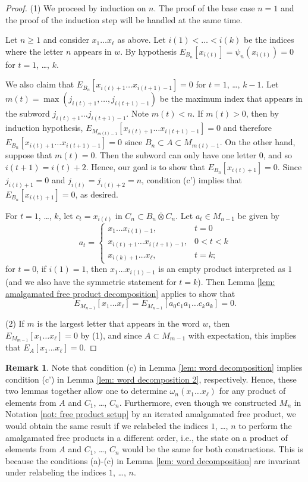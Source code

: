 \documentclass[10pt]{amsart}
\numberwithin{equation}{section}
\theoremstyle{definition}
\newtheorem{remark}[thm]{Remark}
\newcommand{\ootimes}{\mathbin{\overline{\otimes}}}
\begin{document}
\begin{proof}
	(1) We proceed by induction on $n$.  The proof of the base case $n = 1$ and the proof of the induction step will be handled at the same time.
	
	Let $n \geq 1$ and consider $x_1 \dots x_\ell$ as above.  Let $i(1) < \dots < i(k)$ be the indices where the letter $n$ appears in $w$.  By hypothesis $E_{B_n}[x_{i(t)}] = \psi_n(x_{i(t)}) = 0$ for $t = 1$, \dots, $k$.
	
	We also claim that $E_{B_n}[x_{i(t)+1} \dots x_{i(t+1)-1}] = 0$ for $t = 1$, \dots, $k-1$.  Let $m(t) = \max(j_{i(t)+1}, \dots, j_{i(t+1)-1})$ be the maximum index that appears in the subword $j_{i(t)+1} \dots j_{i(t+1)-1}$.  Note $m(t) < n$.  If $m(t) > 0$, then by induction hypothesis, $E_{M_{m(t)-1}}[x_{i(t)+1} \dots x_{i(t+1)-1}] = 0$ and therefore $E_{B_n}[x_{i(t)+1} \dots x_{i(t+1)-1}] = 0$ since $B_n \subset A \subset M_{m(t)-1}$. On the other hand, suppose that $m(t) = 0$. Then the subword can only have one letter $0$, and so $i(t+1) = i(t) + 2$. Hence, our goal is to show that $E_{B_n}[x_{i(t)+1}] = 0$.  Since $j_{i(t)+1} = 0$ and  $j_{i(t)} = j_{i(t)+2}= n$, condition (c') implies that $E_{B_n}[x_{i(t)+1}] = 0$, as desired.
	
	For $t = 1$, \dots, $k$, let $c_t = x_{i(t)}$ in $C_n \subset B_n \ootimes C_n$.  Let $a_t \in M_{n-1}$ be given by
	\[
	a_t = \begin{cases}
		x_1 \dots x_{i(1)-1}, & t = 0 \\
		x_{i(t)+1} \dots x_{i(t+1)-1}, & 0 < t < k \\
		x_{i(k)+1} \dots x_\ell, & t = k;
	\end{cases}
	\]
	for $t = 0$, if $i(1) = 1$, then $x_1 \dots x_{i(1)-1}$ is an empty product interpreted as $1$ (and we also have the symmetric statement for $t = k$).
	Then Lemma \ref{lem: amalgamated free product decomposition} applies to show that
	\[
	E_{M_{n-1}}[x_1 \dots x_\ell] = E_{M_{n-1}}[a_0 c_1 a_1 \dots c_k a_k] = 0.
	\]
	
	(2) If $m$ is the largest letter that appears in the word $w$, then $E_{M_{m-1}}[x_1 \dots x_\ell] = 0$ by (1), and since $A \subset M_{m-1}$ with expectation, this implies that $E_A[x_1 \dots x_\ell] = 0$.
\end{proof}

\begin{remark} \label{rem: relabeling indices}
	Note that condition (c) in Lemma \ref{lem: word decomposition} implies condition (c') in Lemma \ref{lem: word decomposition 2}, respectively. Hence, these two lemmas together allow one to determine $\omega_n(x_1 \dots x_\ell)$ for any product of elements from $A$ and $C_1$, \dots, $C_n$.  Furthermore, even though we constructed $M_n$ in Notation \ref{not: free product setup} by an iterated amalgamated free product, we would obtain the same result if we relabeled the indices $1$, \dots, $n$ to perform the amalgamated free products in a different order, i.e., the state on a product of elements from $A$ and $C_1$, \dots, $C_n$ would be the same for both constructions. This is because the conditions (a)-(c) in Lemma \ref{lem: word decomposition} are invariant under relabeling the indices $1$, \dots, $n$.
\end{remark}
\end{document}
